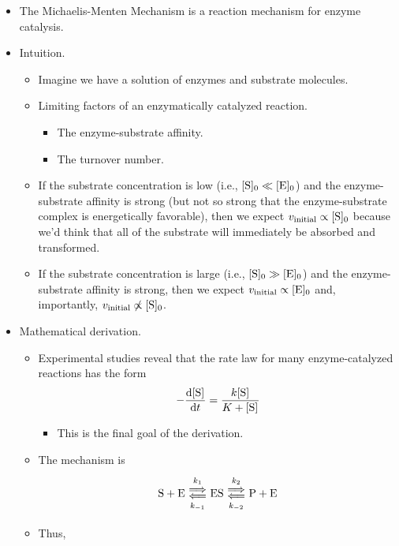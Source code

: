 \documentclass[../notes.tex]{subfiles}
\begin{document}
\begin{itemize}
    \item The Michaelis-Menten Mechanism is a reaction mechanism for enzyme catalysis.
    \item Intuition.
    \begin{itemize}
        \item Imagine we have a solution of enzymes and substrate molecules.
        \item Limiting factors of an enzymatically catalyzed reaction.
        \begin{itemize}
            \item The enzyme-substrate affinity.
            \item The turnover number.
        \end{itemize}
        \item If the substrate concentration is low (i.e., $\cnc[0]{S}\ll\cnc[0]{E}$) and the enzyme-substrate affinity is strong (but not so strong that the enzyme-substrate complex is energetically favorable), then we expect $v_\text{initial}\propto\cnc[0]{S}$ because we'd think that all of the substrate will immediately be absorbed and transformed.
        \item If the substrate concentration is large (i.e., $\cnc[0]{S}\gg\cnc[0]{E}$) and the enzyme-substrate affinity is strong, then we expect $v_\text{initial}\propto\cnc[0]{E}$ and, importantly, $v_\text{initial}\not\propto\cnc[0]{S}$.
    \end{itemize}
    \item Mathematical derivation.
    \begin{itemize}
        \item Experimental studies reveal that the rate law for many enzyme-catalyzed reactions has the form
        \begin{equation*}
            -\dv{\cnc{S}}{t} = \frac{k\cnc{S}}{K+\cnc{S}}
        \end{equation*}
        \begin{itemize}
            \item This is the final goal of the derivation.
        \end{itemize}
        \item The mechanism is
        \begin{equation*}
            \ce{S + E} \Longleftrightarrows[k_1][k_{-1}] \ce{ES}
            \Longleftrightarrows[k_2][k_{-2}] \ce{P + E}
        \end{equation*}
        \item Thus,
        \begin{gather*}

\end{gather*}
\end{itemize}
\end{itemize}
\end{document}
